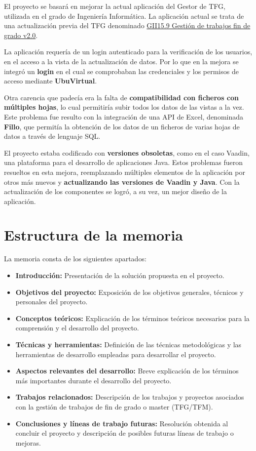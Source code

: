El proyecto se basará en mejorar la actual aplicación del Gestor de TFG, utilizada en el grado de Ingeniería Informática. La aplicación actual se trata de una actualización previa del TFG denominado \href{https://github.com/jfb0019/Gestor-TFG-2016}{GII15.9 Gestión de trabajos fin de grado v2.0}. 

La aplicación requería de un login autenticado para la verificación de los usuarios, en el acceso a la vista de la actualización de datos. Por lo que en la mejora se integró un \textbf{login} en el cual se comprobaban las credenciales y los permisos de acceso mediante \textbf{UbuVirtual}.

Otra carencia que padecía era la falta de \textbf{compatibilidad con ficheros con múltiples hojas}, lo cual permitiría subir todos los datos de las vistas a la vez. Este problema fue resulto con la integración de una API de Excel, denominada \textbf{Fillo}, que permitía la obtención de los datos de un ficheros de varias hojas de datos a través de lenguaje SQL.

El proyecto estaba codificado con \textbf{versiones obsoletas}, como en el caso Vaadin, una plataforma para el desarrollo de aplicaciones Java. Estos problemas fueron resueltos en esta mejora, reemplazando múltiples elementos de la aplicación por otros más nuevos y \textbf{actualizando las versiones de Vaadin y Java}. Con la actualización de los componentes se logró, a su vez, un mejor diseño de la aplicación.

\section{Estructura de la memoria}
La memoria consta de los siguientes apartados:

\begin{itemize}
	\item \textbf{Introducción:} Presentación de la solución propuesta en el proyecto. 
	\item \textbf{Objetivos del proyecto:}  Exposición de los  objetivos generales, técnicos y personales del proyecto.
	\item \textbf{Conceptos teóricos:} Explicación de los términos teóricos necesarios para la comprensión y el desarrollo del proyecto.
	\item \textbf{Técnicas y herramientas:} Definición de las técnicas metodológicas y las herramientas de desarrollo empleadas para desarrollar el proyecto.
	\item \textbf{Aspectos relevantes del desarrollo:} Breve explicación de los términos más importantes durante el desarrollo del proyecto.
	\item \textbf{Trabajos relacionados:} Descripción de los trabajos y proyectos asociados con la gestión de trabajos de fin de grado o master (TFG/TFM).
	\item \textbf{Conclusiones y líneas de trabajo futuras:} Resolución obtenida al concluir el proyecto y descripción de posibles futuras líneas de trabajo o mejoras.
\end{itemize}